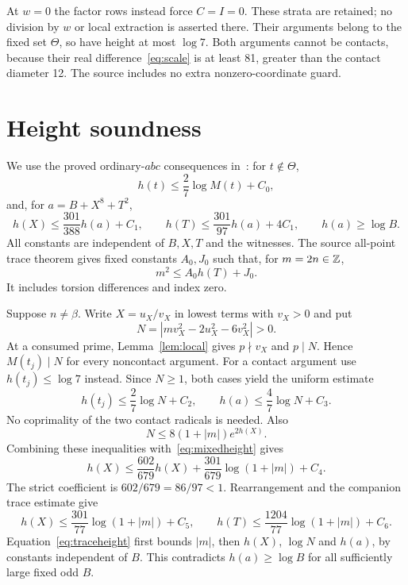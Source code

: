 \documentclass[11pt,a4paper]{article}
\theoremstyle{remark}\newtheorem{remark}[theorem]{Remark}
\begin{document}
At $w=0$ the factor rows instead force $C=I=0$. These strata are
retained; no division by $w$ or local extraction is asserted there.
Their arguments belong to the fixed set $\Theta$, so have height at
most $\log7$. Both arguments cannot be contacts, because their real
difference~\eqref{eq:scale} is at least 81, greater than the contact
diameter 12. The source includes no extra nonzero-coordinate guard.

\section{Height soundness}
We use the proved ordinary-$abc$ consequences in~\cite{ABC78}:
for $t\notin\Theta$,
\begin{equation}\label{eq:contactheight}
 h(t)\le\frac27\log M(t)+C_0,
\end{equation}
and, for $a=B+X^8+T^2$,
\begin{equation}\label{eq:mixedheight}
 h(X)\le\frac{301}{388}h(a)+C_1,\qquad
 h(T)\le\frac{301}{97}h(a)+4C_1,\qquad h(a)\ge\log B.
\end{equation}
All constants are independent of $B,X,T$ and the witnesses.
The source all-point trace theorem gives fixed constants $A_0,J_0$
such that, for $m=2n\in\mathbb Z$,
\begin{equation}\label{eq:traceheight}
                         m^2\le A_0h(T)+J_0.
\end{equation}
It includes torsion differences and index zero.

Suppose $n\ne\beta$. Write $X=u_X/v_X$ in lowest terms with
$v_X>0$ and put
\[
 N=|m v_X^2-2u_X^2-6v_X^2|>0.
\]
At a consumed prime, Lemma~\ref{lem:local} gives $p\nmid v_X$
and $p\mid N$. Hence $M(t_j)\mid N$ for every noncontact argument.
For a contact argument use $h(t_j)\le\log7$ instead. Since $N\ge1$,
both cases yield the uniform estimate
\[
 h(t_j)\le\frac27\log N+C_2,
 \qquad h(a)\le\frac47\log N+C_3.
\]
No coprimality of the two contact radicals is needed. Also
\[
                   N\le8(1+|m|)e^{2h(X)}.
\]
Combining these inequalities with~\eqref{eq:mixedheight} gives
\[
 h(X)\le\frac{602}{679}h(X)
             +\frac{301}{679}\log(1+|m|)+C_4.
\]
The strict coefficient is $602/679=86/97<1$. Rearrangement and the
companion trace estimate give
\[
 h(X)\le\frac{301}{77}\log(1+|m|)+C_5,\qquad
 h(T)\le\frac{1204}{77}\log(1+|m|)+C_6.
\]
Equation~\eqref{eq:traceheight} first bounds $|m|$, then $h(X)$,
$\log N$ and $h(a)$, by constants independent of $B$. This contradicts
$h(a)\ge\log B$ for all sufficiently large fixed odd $B$.
\end{document}
